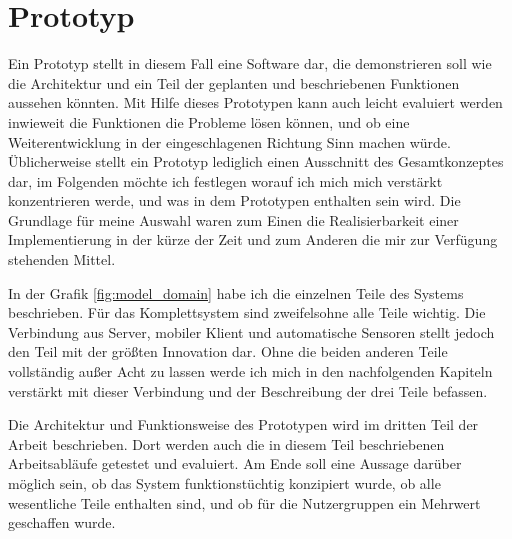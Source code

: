 \chapter{Prototyp}
Ein Prototyp stellt in diesem Fall eine Software dar, die demonstrieren soll wie die Architektur und ein Teil der geplanten und beschriebenen Funktionen aussehen könnten. Mit Hilfe dieses Prototypen kann auch leicht evaluiert werden inwieweit die Funktionen die Probleme lösen können, und ob eine Weiterentwicklung in der eingeschlagenen Richtung Sinn machen würde. Üblicherweise stellt ein Prototyp lediglich einen Ausschnitt des Gesamtkonzeptes dar, im Folgenden möchte ich festlegen worauf ich mich mich verstärkt konzentrieren werde, und was in dem Prototypen enthalten sein wird. Die Grundlage für meine Auswahl waren zum Einen die Realisierbarkeit einer Implementierung in der kürze der Zeit und zum Anderen die mir zur Verfügung stehenden Mittel.

In der Grafik \ref{fig:model_domain} habe ich die einzelnen Teile des Systems beschrieben. Für das Komplettsystem sind zweifelsohne alle Teile wichtig. Die Verbindung aus Server, mobiler Klient und automatische Sensoren stellt jedoch den Teil mit der größten Innovation dar. Ohne die beiden anderen Teile vollständig außer Acht zu lassen werde ich mich in den nachfolgenden Kapiteln verstärkt mit dieser Verbindung und der Beschreibung der drei Teile befassen.

Die Architektur und Funktionsweise des Prototypen wird im dritten Teil der Arbeit beschrieben. Dort werden auch die in diesem Teil beschriebenen Arbeitsabläufe getestet und evaluiert. Am Ende soll eine Aussage darüber möglich sein, ob das System funktionstüchtig konzipiert wurde, ob alle wesentliche Teile enthalten sind, und ob für die Nutzergruppen ein Mehrwert geschaffen wurde.